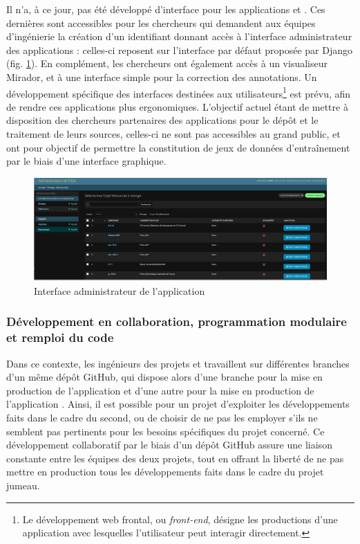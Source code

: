     Il n'a, à ce jour, pas été développé d'interface pour les applications \eida et \vhs. Ces dernières sont accessibles pour les chercheurs qui demandent aux équipes d'ingénierie la création d'un identifiant donnant accès à l'interface administrateur des applications : celles-ci reposent sur l'interface par défaut proposée par Django (fig. \ref{fig:eida_admin}). En complément, les chercheurs ont également accès à un visualiseur Mirador, et à une interface simple pour la correction des annotations. Un développement spécifique des interfaces destinées aux utilisateurs\footnote{Le développement web frontal, ou \textit{front-end}, désigne les productions d'une application avec lesquelles l'utilisateur peut interagir directement.} est prévu, afin de rendre ces applications plus ergonomiques. L'objectif actuel étant de mettre à disposition des chercheurs partenaires des applications pour le dépôt et le traitement de leurs sources, celles-ci ne sont pas accessibles au grand public, et ont pour objectif de permettre la constitution de jeux de données d'entraînement par le biais d'une interface graphique. 
    
    \begin{figure}[h]
    	\centering
    	\includegraphics[width=16cm]{images/eida_admin.png}
    	\caption{Interface administrateur de l'application \eida}
    	\label{fig:eida_admin}
    \end{figure}
    
    \subsubsection{Développement en collaboration, programmation modulaire et remploi du code}
    Dans ce contexte, les ingénieurs des projets \eida et \vhs travaillent sur différentes branches d'un même dépôt GitHub, qui dispose alors d'une branche pour la mise en production de l'application \eida et d'une autre pour la mise en production de l'application \vhs. Ainsi, il est possible pour un projet d'exploiter les développements faits dans le cadre du second, ou de choisir de ne pas les employer s'ils ne semblent pas pertinents pour les besoins spécifiques du projet concerné. Ce développement collaboratif par le biais d'un dépôt GitHub assure une liaison constante entre les équipes des deux projets, tout en offrant la liberté de ne pas mettre en production tous les développements faits dans le cadre du projet jumeau.
    
